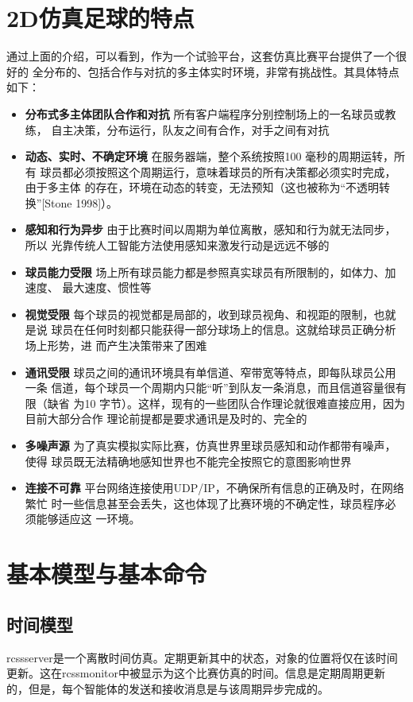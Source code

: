 \section{2D仿真足球的特点}

通过上面的介绍，可以看到，作为一个试验平台，这套仿真比赛平台提供了一个很好的
全分布的、包括合作与对抗的多主体实时环境，非常有挑战性。其具体特点如下：
\begin{itemize}
	\item \textbf{分布式多主体团队合作和对抗}  所有客户端程序分别控制场上的一名球员或教练，
	自主决策，分布运行，队友之间有合作，对手之间有对抗
	\item \textbf{动态、实时、不确定环境}  在服务器端，整个系统按照100 毫秒的周期运转，所有
	球员都必须按照这个周期运行，意味着球员的所有决策都必须实时完成，由于多主体
	的存在，环境在动态的转变，无法预知（这也被称为“不透明转换”[Stone 1998]）。
	\item \textbf{感知和行为异步}  由于比赛时间以周期为单位离散，感知和行为就无法同步，所以
	光靠传统人工智能方法使用感知来激发行动是远远不够的
	\item \textbf{球员能力受限}  场上所有球员能力都是参照真实球员有所限制的，如体力、加速度、
	最大速度、惯性等
	\item \textbf{视觉受限}  每个球员的视觉都是局部的，收到球员视角、和视距的限制，也就是说
	球员在任何时刻都只能获得一部分球场上的信息。这就给球员正确分析场上形势，进
	而产生决策带来了困难
	\item \textbf{通讯受限}  球员之间的通讯环境具有单信道、窄带宽等特点，即每队球员公用一条
	信道，每个球员一个周期内只能“听”到队友一条消息，而且信道容量很有限（缺省
	为10 字节）。这样，现有的一些团队合作理论就很难直接应用，因为目前大部分合作
	理论前提都是要求通讯是及时的、完全的
	\item \textbf{多噪声源}  为了真实模拟实际比赛，仿真世界里球员感知和动作都带有噪声，使得
	球员既无法精确地感知世界也不能完全按照它的意图影响世界
	\item \textbf{连接不可靠}  平台网络连接使用UDP/IP，不确保所有信息的正确及时，在网络繁忙
	时一些信息甚至会丢失，这也体现了比赛环境的不确定性，球员程序必须能够适应这
	一环境。
\end{itemize}

\section{基本模型与基本命令}
\subsection{时间模型}
rcssserver是一个离散时间仿真。定期更新其中的状态，对象的位置将仅在该时间更新。这在rcssmonitor中被显示为这个比赛仿真的时间。信息是定期周期更新的，但是，每个智能体的发送和接收消息是与该周期异步完成的。

